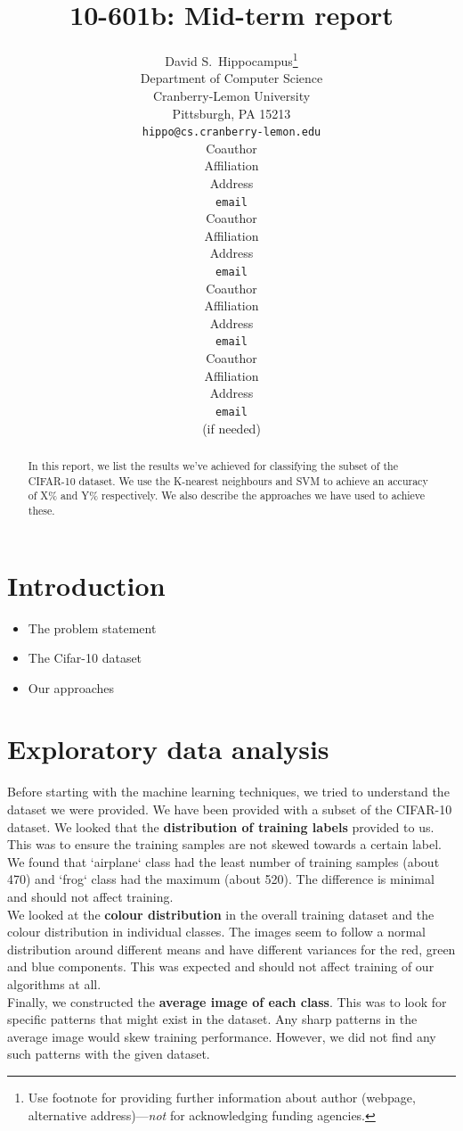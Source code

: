 \documentclass{article} %
\title{10-601b: Mid-term report}
\author{
David S.~Hippocampus\thanks{ Use footnote for providing further information
about author (webpage, alternative address)---\emph{not} for acknowledging
funding agencies.} \\
Department of Computer Science\\
Cranberry-Lemon University\\
Pittsburgh, PA 15213 \\
\texttt{hippo@cs.cranberry-lemon.edu} \\
\And
Coauthor \\
Affiliation \\
Address \\
\texttt{email} \\
\AND
Coauthor \\
Affiliation \\
Address \\
\texttt{email} \\
\And
Coauthor \\
Affiliation \\
Address \\
\texttt{email} \\
\And
Coauthor \\
Affiliation \\
Address \\
\texttt{email} \\
(if needed)\\
}
\begin{document}
\maketitle

\begin{abstract}
    In this report, we list the results we've achieved for classifying the subset of the CIFAR-10 dataset. We use the K-nearest neighbours and SVM to achieve an accuracy of X\% and Y\% respectively. We also describe the approaches we have used to achieve these.\\
\end{abstract}

\section{Introduction}
    \begin{itemize}
        \item The problem statement
        \item The Cifar-10 dataset
        \item Our approaches
    \end{itemize}

\section{Exploratory data analysis}
    Before starting with the machine learning techniques, we tried to understand the dataset we were provided. We have been provided with a subset of the CIFAR-10 dataset. We looked that the \textbf{distribution of training labels} provided to us. This was to ensure the training samples are not skewed towards a certain label. We found that `airplane` class had the least number of training samples (about 470) and `frog` class had the maximum (about 520). The difference is minimal and should not affect training.\\

    We looked at the \textbf{colour distribution} in the overall training dataset and the colour distribution in individual classes. The images seem to follow a normal distribution around different means and have different variances for the red, green and blue components. This was expected and should not affect training of our algorithms at all.\\

    Finally, we constructed the \textbf{average image of each class}. This was to look for specific patterns that might exist in the dataset. Any sharp patterns in the average image would skew training performance. However, we did not find any such patterns with the given dataset.\\
\end{document}
